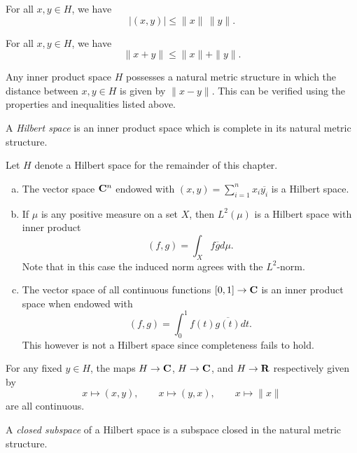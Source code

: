 \begin{proposition}
  For all $x,y \in H$, we have
  \[
  |(x,y)| \leq \|x\| \, \|y\|.
  \]
\end{proposition}

\begin{proposition}
  For all $x,y \in H$, we have
  \[
  \|x+y\| \leq \|x\| + \|y\|.
  \]
\end{proposition}

\begin{remark}
  Any inner product space $H$ possesses a natural metric structure in which the distance between $x,y \in H$ is given by $\|x-y\|$. This can be verified using the properties and inequalities listed above.
\end{remark}

\begin{definition}
  A \emph{Hilbert space} is an inner product space which is complete in its natural metric structure.
\end{definition}

Let $H$ denote a Hilbert space for the remainder of this chapter.

\begin{example}
  \mbox{}
  \begin{enumerate}[(a)]
  \item The vector space $\mathbf{C}^n$ endowed with $(x,y) = \sum_{i=1}^n x_i \overline{y_i}$ is a Hilbert space.
  \item If $\mu$ is any positive measure on a set $X$, then $L^2(\mu)$ is a Hilbert space with inner product
    \[
    (f,g) = \int_X f \overline{g} d\mu.
    \]
    Note that in this case the induced norm agrees with the $L^2$-norm.
  \item The vector space of all continuous functions $[0,1] \rightarrow \mathbf{C}$ is an inner product space when endowed with
    \[
    (f,g) = \int_0^1 f(t) \overline{g(t)} d t.
    \]
    This however is not a Hilbert space since completeness fails to hold.
  \end{enumerate}
\end{example}

\begin{theorem}
  For any fixed $y \in H$, the maps $H \rightarrow \mathbf{C}$, $H \rightarrow \mathbf{C}$, and $H \rightarrow \mathbf{R}$ respectively given by
  \[
  x \mapsto (x,y), \qquad
  x \mapsto (y,x), \qquad
  x \mapsto \|x\|
  \]
  are all continuous.
\end{theorem}

\begin{definition}
  A \emph{closed subspace} of a Hilbert space is a subspace closed in the natural metric structure.
\end{definition}

